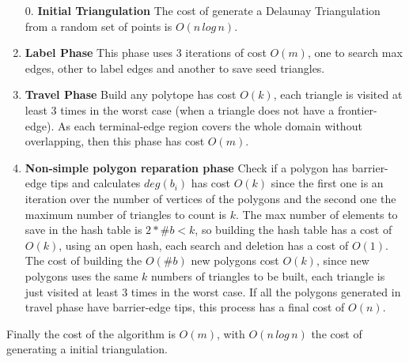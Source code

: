 \begin{enumerate}
    \item[0.] \textbf{Initial Triangulation} The cost of generate a Delaunay Triangulation from a random set of points is $O(n\, log\, n)$.
    \item \textbf{Label Phase} This phase uses 3 iterations of cost $O(m)$, one to search max edges, other to label edges and another to save seed triangles.
    \item \textbf{Travel Phase} Build any polytope has cost $O(k)$, each triangle is visited at least 3 times in the worst case (when a triangle does not have a frontier-edge). As each terminal-edge region covers the whole domain without overlapping, then this phase has cost $O(m)$.
    \item \textbf{Non-simple polygon reparation phase} Check if a polygon has barrier-edge tips and calculates $deg(b_i)$ has cost $O(k)$ since the first one is an iteration over the number of vertices of the polygons and the second one the maximum number of triangles to count is $k$.  The max number of elements to save in the hash table is $2*\#b < k$, so building the hash table has a cost of $O(k)$, using an open hash, each search and deletion has a cost of $O(1)$. The cost of building the $O(\#b)$  new polygons cost $O(k)$, since new polygons uses the same $k$ numbers of triangles to be built, each triangle is just visited at least 3 times in the worst case. If all the polygons generated in travel phase have barrier-edge tips, this process has a final cost of $O(n)$.

\end{enumerate}

Finally the cost of the algorithm is $O(m)$, with $O(n\,log\,n)$ the cost of generating a initial triangulation.
    




